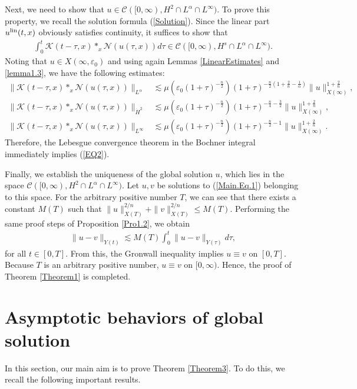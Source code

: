 \documentclass[11pt,reqno]{amsart}
\begin{document}
 Next, we need to show that $u \in \mathcal{C}([0,\infty), H^2 \cap L^{\alpha} \cap L^{\infty})$. To prove this property, we recall the solution formula (\ref{Solution}).
 Since the linear part $u^{\rm lin}(t,x)$ obviously satisfies continuity, it suffices to show that
\begin{align}
    \int_0^t  \mathcal{K}(t-\tau,x) \ast_x \mathcal{N}(u(\tau,x)) d\tau \in \mathcal{C}([0,\infty), H^s \cap L^{\alpha} \cap L^\infty). \label{EQ2}
\end{align}
Noting that $u \in X(\infty, \varepsilon_0)$ and using again Lemmas \ref{LinearEstimates} and \ref{lemma1.3}, we have the following estimates:
\begin{align*}
    \|\mathcal{K}(t-\tau,x) \ast_x \mathcal{N}(u(\tau, x))\|_{L^{\alpha}} &\lesssim \mu\left(\varepsilon_0 (1+\tau)^{-\frac{n}{2}}\right) (1+\tau)^{-\frac{n}{2}(1+\frac{2}{n}-\frac{1}{\alpha})} \|u\|_{X(\infty)}^{1+\frac{2}{n}},\\
    \|\mathcal{K}(t-\tau,x) \ast_x \mathcal{N}(u(\tau, x))\|_{\dot{H}^2} &\lesssim \mu\left(\varepsilon_0 (1+\tau)^{-\frac{n}{2}}\right)  (1+\tau)^{-\frac{n}{4}-\frac{3}{2}} \|u\|_{X(\infty)}^{1+\frac{2}{n}}, \\
    \|\mathcal{K}(t-\tau,x) \ast_x \mathcal{N}(u(\tau, x))\|_{L^\infty} &\lesssim \mu\left(\varepsilon_0 (1+\tau)^{-\frac{n}{2}}\right) (1+\tau)^{-\frac{n}{2}-1} \|u\|_{X(\infty)}^{1+\frac{2}{n}}.
\end{align*}
Therefore, the Lebesgue convergence theorem in the Bochner integral immediately implies (\ref{EQ2}).

 Finally, we establish the uniqueness of the global solution 
$u$, which lies in the space $\mathcal{C}([0, \infty), H^2 \cap L^\alpha \cap L^\infty)$. Let $u, v$ be solutions to (\ref{Main.Eq.1}) belonging to this space. For the arbitrary positive number $T$, we can see that there exists a constant $M(T)$ such that $\|u\|_{X(T)}^{2/n}+ \|v\|_{X(T)}^{2/n} \leq M(T)$. Performing the same proof steps of Proposition \ref{Pro1.2}, we obtain
\begin{align*}
    \|u-v\|_{Y(t)} \lesssim M(T) \int_0^t \| u -v\|_{Y(\tau)}  d\tau,
\end{align*}
for all $t \in [0,T]$. 
From this, the
Gronwall inequality implies $ u \equiv v$ on $[0,T]$. Because $T $ is an arbitrary positive number, $u \equiv v$ on $[0, \infty)$.
Hence, the proof of Theorem \ref{Theorem1} is completed.
\section{Asymptotic behaviors of global solution}\label{Section_Asym}
In this section, our main aim is to prove Theorem \ref{Theorem3}. To do this, we recall the following important results.
\vspace{0.2cm}
\end{document}
